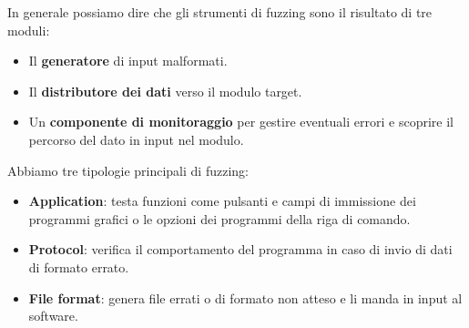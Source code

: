 In generale possiamo dire che gli strumenti di fuzzing sono il risultato di tre moduli:
\begin{itemize}
	\item Il \textbf{generatore} di input malformati.
	\item Il \textbf{distributore dei dati} verso il modulo target.
	\item Un \textbf{componente di monitoraggio} per gestire eventuali errori e scoprire il percorso del dato in input
	      nel modulo.
\end{itemize}
Abbiamo tre tipologie principali di fuzzing:
\begin{itemize}
	\item \textbf{Application}: testa funzioni come pulsanti e campi di immissione dei programmi grafici o le opzioni
	      dei programmi della riga di comando.
	\item \textbf{Protocol}: verifica il comportamento del programma in caso di invio di dati di formato errato.
	\item \textbf{File format}: genera file errati o di formato non atteso e li manda in input al software.
\end{itemize}